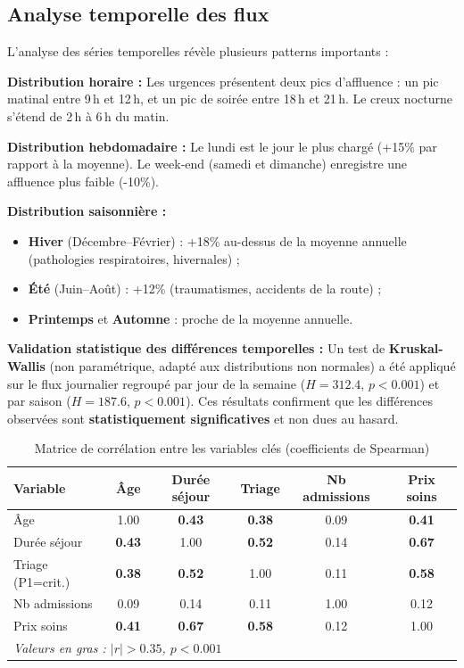 \documentclass[12pt,a4paper]{report}
\begin{document}
	\subsection{Analyse temporelle des flux}
	
	L'analyse des séries temporelles révèle plusieurs patterns importants :
	
	\textbf{Distribution horaire :} Les urgences présentent deux pics d'affluence : un pic
	matinal entre 9\,h et 12\,h, et un pic de soirée entre 18\,h et 21\,h. Le creux nocturne s'étend
	de 2\,h à 6\,h du matin.
	
	\textbf{Distribution hebdomadaire :} Le lundi est le jour le plus chargé (+15\% par rapport
	à la moyenne). Le week-end (samedi et dimanche) enregistre une affluence plus faible (-10\%).
	
	\textbf{Distribution saisonnière :}
	\begin{itemize}
		\item \textbf{Hiver} (Décembre--Février) : +18\% au-dessus de la moyenne annuelle
		(pathologies respiratoires, hivernales) ;
		\item \textbf{Été} (Juin--Août) : +12\% (traumatismes, accidents de la route) ;
		\item \textbf{Printemps} et \textbf{Automne} : proche de la moyenne annuelle.
	\end{itemize}
	
	\textbf{Validation statistique des différences temporelles :} Un test de
	\textbf{Kruskal-Wallis} (non paramétrique, adapté aux distributions non normales)
	a été appliqué sur le flux journalier regroupé par jour de la semaine
	($H = 312.4$, $p < 0.001$) et par saison ($H = 187.6$, $p < 0.001$). Ces résultats
	confirment que les différences observées sont \textbf{statistiquement significatives}
	et non dues au hasard.
	
	\begin{table}[H]
		\centering
		\caption{Matrice de corrélation entre les variables clés (coefficients de Spearman)}
		\renewcommand{\arraystretch}{1.3}
		\begin{tabular}{lccccc}
			\toprule
			\textbf{Variable} & \textbf{Âge} & \textbf{Durée séjour} & \textbf{Triage} & \textbf{Nb admissions} & \textbf{Prix soins} \\
			\midrule
			Âge             & 1.00 & \textbf{0.43} & \textbf{0.38} & 0.09 & \textbf{0.41} \\
			Durée séjour    & \textbf{0.43} & 1.00 & \textbf{0.52} & 0.14 & \textbf{0.67} \\
			Triage (P1=crit.) & \textbf{0.38} & \textbf{0.52} & 1.00 & 0.11 & \textbf{0.58} \\
			Nb admissions   & 0.09 & 0.14 & 0.11 & 1.00 & 0.12 \\
			Prix soins      & \textbf{0.41} & \textbf{0.67} & \textbf{0.58} & 0.12 & 1.00 \\
			\bottomrule
			\multicolumn{6}{l}{\textit{Valeurs en gras : $|r| > 0.35$, $p < 0.001$}} \\
		\end{tabular}
	\end{table}
	
\end{document}
